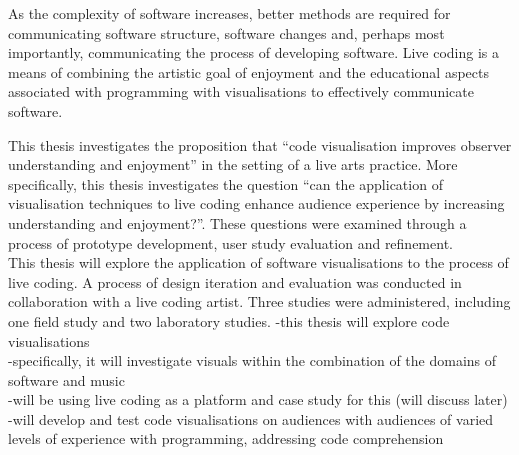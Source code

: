 As the complexity of software increases, better methods are required for communicating software structure, software changes and, perhaps most importantly, communicating the process of developing software. Live coding is a means of combining the artistic goal of enjoyment and the educational aspects associated with programming with visualisations to effectively communicate software.

This thesis investigates the proposition that ``code visualisation improves observer understanding and enjoyment'' in the setting of a live arts practice. More specifically, this thesis investigates the question ``can the application of visualisation techniques to live coding enhance audience experience by increasing understanding and enjoyment?''. These questions were examined through a process of prototype development, user study evaluation and refinement.\\

This thesis will explore the application of software visualisations to the process of live coding. A process of design iteration and evaluation was conducted in collaboration with a live coding artist. Three studies were administered, including one field study and two laboratory studies.
-this thesis will explore code visualisations\\
-specifically, it will investigate visuals within the combination of the domains of software and music\\
-will be using live coding as a platform and case study for this (will discuss later)\\
-will develop and test code visualisations on audiences with audiences of varied levels of experience with programming, addressing code comprehension\\



